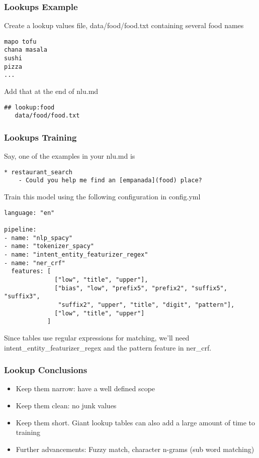  \begin{frame}[fragile]\frametitle{Lookups Example}
Create a lookup values file, data/food/food.txt containing several food names

\begin{lstlisting}
mapo tofu
chana masala
sushi
pizza
...
\end{lstlisting}

Add that at the end of nlu.md
\begin{lstlisting}
## lookup:food
   data/food/food.txt
\end{lstlisting}

\end{frame}

 \begin{frame}[fragile]\frametitle{Lookups Training}
Say, one of the examples in your nlu.md is

\begin{lstlisting}
* restaurant_search
	- Could you help me find an [empanada](food) place?

\end{lstlisting}
Train this model using the following configuration in config.yml
\begin{lstlisting}
language: "en"

pipeline:
- name: "nlp_spacy"
- name: "tokenizer_spacy"
- name: "intent_entity_featurizer_regex"
- name: "ner_crf"
  features: [
              ["low", "title", "upper"],
              ["bias", "low", "prefix5", "prefix2", "suffix5", "suffix3",
               "suffix2", "upper", "title", "digit", "pattern"],
              ["low", "title", "upper"]
            ]
\end{lstlisting}

Since tables use regular expressions for matching, we'll need intent\_entity\_featurizer\_regex and the pattern feature in ner\_crf.

\end{frame}

 \begin{frame}[fragile]\frametitle{Lookup Conclusions}
\begin{itemize}
\item Keep them narrow: have a well defined scope
\item Keep them clean: no junk values
\item Keep them short. Giant lookup tables can also add a large amount of time to training
\item Further advancements: Fuzzy match, character n-grams (sub word matching)
\end{itemize}


\end{frame}
